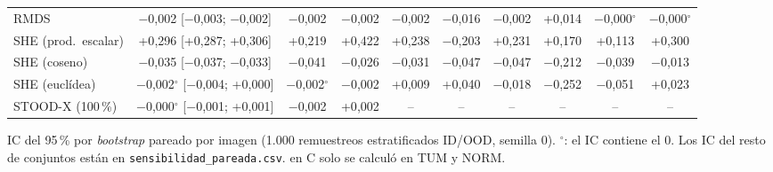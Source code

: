 \begin{table}
\begin{tabular*}{\linewidth}{@{\extracolsep{\fill}}lccccccccc}
RMDS & $-$0{,}002 [$-$0{,}003; $-$0{,}002] & $-$0{,}002 & $-$0{,}002 & $-$0{,}002 & $-$0{,}016 & $-$0{,}002 & +0{,}014 & $-$0{,}000$^{\circ}$ & $-$0{,}000$^{\circ}$ \\
SHE (prod.\ escalar) & +0{,}296 [+0{,}287; +0{,}306] & +0{,}219 & +0{,}422 & +0{,}238 & $-$0{,}203 & +0{,}231 & +0{,}170 & +0{,}113 & +0{,}300 \\
SHE (coseno) & $-$0{,}035 [$-$0{,}037; $-$0{,}033] & $-$0{,}041 & $-$0{,}026 & $-$0{,}031 & $-$0{,}047 & $-$0{,}047 & $-$0{,}212 & $-$0{,}039 & $-$0{,}013 \\
SHE (euclídea) & $-$0{,}002$^{\circ}$ [$-$0{,}004; +0{,}000] & $-$0{,}002$^{\circ}$ & $-$0{,}002 & +0{,}009 & +0{,}040 & $-$0{,}018 & $-$0{,}252 & $-$0{,}051 & +0{,}023 \\
STOOD-X (100\,\%) & $-$0{,}000$^{\circ}$ [$-$0{,}001; +0{,}001] & $-$0{,}002 & +0{,}002 & -- & -- & -- & -- & -- & -- \\
\bottomrule
\end{tabular*}

\smallskip
\parbox{\linewidth}{\scriptsize IC del 95\,\% por \emph{bootstrap} pareado por imagen (1.000 remuestreos estratificados ID/OOD, semilla 0). $^{\circ}$: el IC contiene el 0. Los IC del resto de conjuntos están en \texttt{sensibilidad\_pareada.csv}. \stoodx en C solo se calculó en TUM y NORM.}
\end{table}
